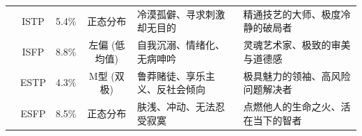 \documentclass[UTF8,letter,10pt]{ctexart}
\begin{document}
\begin{table}[h!]
\begin{tabular}{c c c c L{4.2cm} L{4.2cm}}
        & ISTP & 5.4\% & 正态分布 & 冷漠孤僻、寻求刺激却无目的 & 精通技艺的大师、极度冷静的破局者 \\
        & ISFP & 8.8\% & 左偏 (低均值) & 自我沉溺、情绪化、无病呻吟 & 灵魂艺术家、极致的审美与道德感 \\
        & ESTP & 4.3\% & M型 (双极) & 鲁莽赌徒、享乐主义、反社会倾向 & 极具魅力的领袖、高风险问题解决者 \\
        & ESFP & 8.5\% & 正态分布 & 肤浅、冲动、无法忍受寂寞 & 点燃他人的生命之火、活在当下的智者 \\

        \bottomrule
    \end{tabular}
\end{table}
\end{document}
